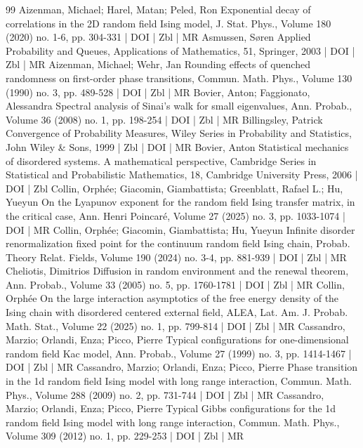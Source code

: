 \documentclass[10pt]{amsart}
\theoremstyle{definition}\newtheorem{defi}[theo]{Definition}\newtheorem{rema}[theo]{Remark}\newtheorem{exam}[theo]{Example}\newtheorem{exem}[theo]{Example}\newtheorem{nota}[theo]{Notation}
\begin{document}
\begin{thebibliography}{99}
 Aizenman, Michael; Harel, Matan; Peled, Ron Exponential decay of correlations in the 2D random field Ising model, J. Stat. Phys., Volume 180 (2020) no. 1-6, pp. 304-331 | DOI | Zbl | MR
 Asmussen, Søren Applied Probability and Queues, Applications of Mathematics, 51, Springer, 2003 | DOI | Zbl | MR
 Aizenman, Michael; Wehr, Jan Rounding effects of quenched randomness on first-order phase transitions, Commun. Math. Phys., Volume 130 (1990) no. 3, pp. 489-528 | DOI | Zbl | MR
 Bovier, Anton; Faggionato, Alessandra Spectral analysis of Sinai’s walk for small eigenvalues, Ann. Probab., Volume 36 (2008) no. 1, pp. 198-254 | DOI | Zbl | MR
 Billingsley, Patrick Convergence of Probability Measures, Wiley Series in Probability and Statistics, John Wiley \& Sons, 1999 | Zbl | DOI | MR
 Bovier, Anton Statistical mechanics of disordered systems. A mathematical perspective, Cambridge Series in Statistical and Probabilistic Mathematics, 18, Cambridge University Press, 2006 | DOI | Zbl
 Collin, Orphée; Giacomin, Giambattista; Greenblatt, Rafael L.; Hu, Yueyun On the Lyapunov exponent for the random field Ising transfer matrix, in the critical case, Ann. Henri Poincaré, Volume 27 (2025) no. 3, pp. 1033-1074 | DOI | MR
 Collin, Orphée; Giacomin, Giambattista; Hu, Yueyun Infinite disorder renormalization fixed point for the continuum random field Ising chain, Probab. Theory Relat. Fields, Volume 190 (2024) no. 3-4, pp. 881-939 | DOI | Zbl | MR
 Cheliotis, Dimitrios Diffusion in random environment and the renewal theorem, Ann. Probab., Volume 33 (2005) no. 5, pp. 1760-1781 | DOI | Zbl | MR
 Collin, Orphée On the large interaction asymptotics of the free energy density of the Ising chain with disordered centered external field, ALEA, Lat. Am. J. Probab. Math. Stat., Volume 22 (2025) no. 1, pp. 799-814 | DOI | Zbl | MR
 Cassandro, Marzio; Orlandi, Enza; Picco, Pierre Typical configurations for one-dimensional random field Kac model, Ann. Probab., Volume 27 (1999) no. 3, pp. 1414-1467 | DOI | Zbl | MR
 Cassandro, Marzio; Orlandi, Enza; Picco, Pierre Phase transition in the 1d random field Ising model with long range interaction, Commun. Math. Phys., Volume 288 (2009) no. 2, pp. 731-744 | DOI | Zbl | MR
 Cassandro, Marzio; Orlandi, Enza; Picco, Pierre Typical Gibbs configurations for the 1d random field Ising model with long range interaction, Commun. Math. Phys., Volume 309 (2012) no. 1, pp. 229-253 | DOI | Zbl | MR

\end{thebibliography}
\end{document}
